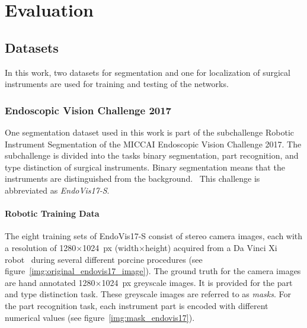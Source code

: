\chapter{Evaluation}
\label{cha:evaluation}

\section{Datasets}
In this work, two datasets for segmentation and one for localization of surgical instruments are used for training and testing of the networks. 

\subsection{Endoscopic Vision Challenge 2017}
\label{sec:endovis17}

One segmentation dataset used in this work is part of the subchallenge Robotic Instrument Segmentation of the MICCAI Endoscopic Vision Challenge 2017. The subchallenge is divided into the tasks binary segmentation, part recognition, and type distinction of surgical instruments. 
Binary segmentation means that the instruments are distinguished from the background.~\cite{EndoVis17}
This challenge is abbreviated as \emph{EndoVis17-S}. 

\subsubsection{Robotic Training Data}
\label{sec:endovis17_training}
The eight training sets of EndoVis17-S consist of stereo camera images, each with a resolution of 1280$\times$1024~px (width$\times$height) acquired from a Da Vinci Xi robot~\cite{davindiXI2015morelli} during several different porcine procedures (see figure~\ref{img:original_endovis17_image}).
The ground truth for the camera images are hand annotated 1280$\times$1024~px greyscale images. It is provided for the part and type distinction task. These greyscale images are referred to as \emph{masks}.
For the part recognition task, each instrument part is encoded with different numerical values (see figure~\ref{img:mask_endovis17}).


